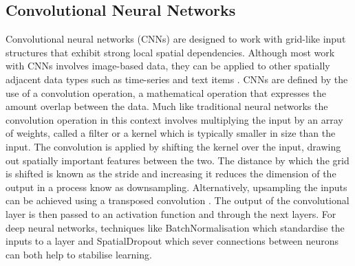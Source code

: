\documentclass[12pt]{iopart}
\begin{document}
\subsection{Convolutional Neural Networks}
%
Convolutional neural networks (CNNs) are designed to work with grid-like input structures that exhibit
strong local spatial dependencies. Although most work with \acp{CNN}
involves image-based data, they can be applied to other spatially adjacent data
types such as time-series \cite{2018arXiv180904356I} and text items \cite{2020arXiv200403705M}. \acp{CNN} are defined by the use of a
convolution operation, a mathematical operation that expresses the amount
overlap between the data. Much like traditional neural networks the convolution operation in this context involves multiplying the input by an array of weights, called a filter or a kernel which is typically smaller in size than the input. The convolution is applied by shifting the kernel over the input, drawing out spatially important features between the
two. The distance by which the grid is shifted is known as
the stride and increasing it reduces the dimension of the output in a process know as downsampling. Alternatively, upsampling the inputs can be achieved using a transposed convolution \cite{dumoulin2016guide}. The output of the convolutional layer is then passed to an activation function and through the next layers. For deep neural networks, techniques like BatchNormalisation \cite{ioffe2015batch} which standardise the inputs to a layer and SpatialDropout \cite{tompson2014efficient} which sever connections between neurons can both help to stabilise learning.  


\end{document}
